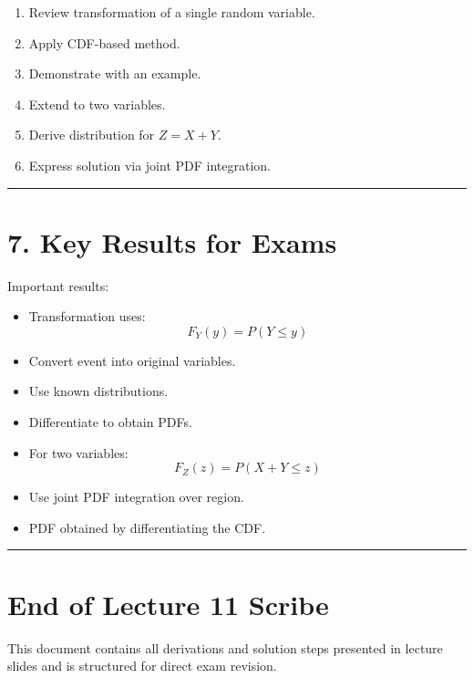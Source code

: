 \documentclass[11pt]{article}
\begin{document}
\begin{enumerate}
    \item Review transformation of a single random variable.
    \item Apply CDF-based method.
    \item Demonstrate with an example.
    \item Extend to two variables.
    \item Derive distribution for \(Z = X + Y\).
    \item Express solution via joint PDF integration.
\end{enumerate}

\hrule
\vspace{0.5em}

\section*{7. Key Results for Exams}

Important results:

\begin{itemize}
    \item Transformation uses:
    \[
    F_Y(y) = P(Y \le y)
    \]
    \item Convert event into original variables.
    \item Use known distributions.
    \item Differentiate to obtain PDFs.
    \item For two variables:
    \[
    F_Z(z) = P(X + Y \le z)
    \]
    \item Use joint PDF integration over region.
    \item PDF obtained by differentiating the CDF.
\end{itemize}

\hrule
\vspace{0.5em}

\section*{End of Lecture 11 Scribe}

This document contains all derivations and solution steps presented in lecture slides and is structured for direct exam revision.
\end{document}
